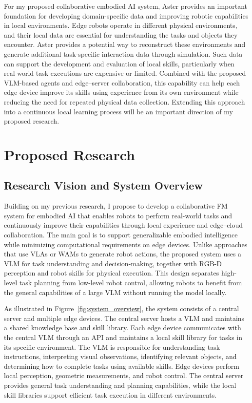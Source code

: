 \documentclass[11pt]{article}
\begin{document}
For my proposed collaborative embodied AI system, Aster provides an important foundation for developing domain-specific data and improving robotic capabilities in local environments. Edge robots operate in different physical environments, and their local data are essential for understanding the tasks and objects they encounter. Aster provides a potential way to reconstruct these environments and generate additional task-specific interaction data through simulation. Such data can support the development and evaluation of local skills, particularly when real-world task executions are expensive or limited. Combined with the proposed VLM-based agents and edge--server collaboration, this capability can help each edge device improve its skills using experience from its own environment while reducing the need for repeated physical data collection. Extending this approach into a continuous local learning process will be an important direction of my proposed research.


\FloatBarrier
\section{Proposed Research}
\label{sec:proposed}

\subsection{Research Vision and System Overview}
\label{subsec:system_overview}

Building on my previous research, I propose to develop a collaborative FM system for embodied AI that enables robots to perform real-world tasks and continuously improve their capabilities through local experience and edge--cloud collaboration. The main goal is to support generalizable embodied intelligence while minimizing computational requirements on edge devices. Unlike approaches that use VLAs or WAMs to generate robot actions, the proposed system uses a VLM for task understanding and decision-making, together with RGB-D perception and robot skills for physical execution. This design separates high-level task planning from low-level robot control, allowing robots to benefit from the general capabilities of a large VLM without running the model locally.

As illustrated in Figure~\ref{fig:system_overview}, the system consists of a central server and multiple edge devices. The central server hosts a VLM and maintains a shared knowledge base and skill library. Each edge device communicates with the central VLM through an API and maintains a local skill library for tasks in its specific environment. The VLM is responsible for understanding task instructions, interpreting visual observations, identifying relevant objects, and determining how to complete tasks using available skills. Edge devices perform local perception, geometric measurements, and robot control. The central server provides general task understanding and planning capabilities, while the local skill libraries support efficient task execution in different environments.
\end{document}
